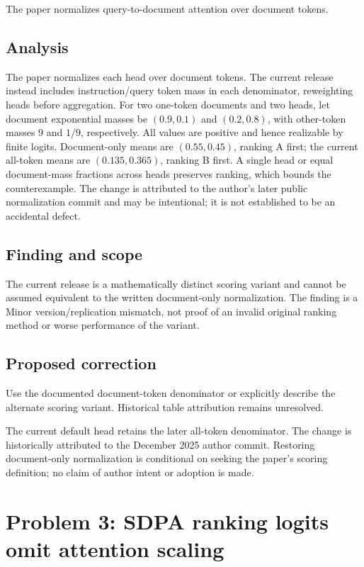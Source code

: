\documentclass[11pt]{article}
\begin{document}
The paper normalizes query-to-document attention over document tokens.

\subsection*{Analysis}

The paper normalizes each head over document tokens. The current release instead includes instruction/query token mass in each denominator, reweighting heads before aggregation. For two one-token documents and two heads, let document exponential masses be \((0.9,0.1)\) and \((0.2,0.8)\), with other-token masses \(9\) and \(1/9\), respectively. All values are positive and hence realizable by finite logits. Document-only means are \((0.55,0.45)\), ranking A first; the current all-token means are \((0.135,0.365)\), ranking B first. A single head or equal document-mass fractions across heads preserves ranking, which bounds the counterexample. The change is attributed to the author’s later public normalization commit and may be intentional; it is not established to be an accidental defect.

\subsection*{Finding and scope}

The current release is a mathematically distinct scoring variant and cannot be assumed equivalent to the written document-only normalization. The finding is a Minor version/replication mismatch, not proof of an invalid original ranking method or worse performance of the variant.

\subsection*{Proposed correction}

Use the documented document-token denominator or explicitly describe the alternate scoring variant. Historical table attribution remains unresolved.

The current default head retains the later all-token denominator. The change is historically attributed to the December 2025 author commit. Restoring document-only normalization is conditional on seeking the paper’s scoring definition; no claim of author intent or adoption is made.

\section*{Problem 3: SDPA ranking logits omit attention scaling}
\end{document}

